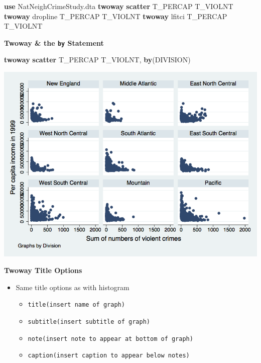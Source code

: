\documentclass[]{book}
\newenvironment{Shaded}{\begin{snugshade}}{\end{snugshade}}
\newcommand{\BaseNTok}[1]{\textcolor[rgb]{0.00,0.00,0.81}{#1}}
\newcommand{\KeywordTok}[1]{\textcolor[rgb]{0.13,0.29,0.53}{\textbf{#1}}}
\newcommand{\NormalTok}[1]{#1}
\providecommand{\tightlist}{%
  \setlength{\itemsep}{0pt}\setlength{\parskip}{0pt}}
\begin{document}
\begin{Shaded}
\begin{Highlighting}[]
  \KeywordTok{use}\NormalTok{ NatNeighCrimeStudy.dta}
  \KeywordTok{twoway} \KeywordTok{scatter}\NormalTok{ T_PERCAP T_VIOLNT}
  \KeywordTok{twoway} \BaseNTok{dropline}\NormalTok{ T_PERCAP T_VIOLNT}
  \KeywordTok{twoway}\NormalTok{  lfitci T_PERCAP T_VIOLNT}
\end{Highlighting}
\end{Shaded}

\textbf{Twoway \& the \texttt{by} Statement}

\begin{Shaded}
\begin{Highlighting}[]
  \KeywordTok{twoway} \KeywordTok{scatter}\NormalTok{ T_PERCAP T_VIOLNT, }\KeywordTok{by}\NormalTok{(DIVISION)}
\end{Highlighting}
\end{Shaded}

\includegraphics{Stata/StataModGraph/images/twowayby.png}

\textbf{Twoway Title Options}

\begin{itemize}
\tightlist
\item
  Same title options as with histogram

  \begin{itemize}
  \tightlist
  \item
    \texttt{title(insert\ name\ of\ graph)}
  \item
    \texttt{subtitle(insert\ subtitle\ of\ graph)}
  \item
    \texttt{note(insert\ note\ to\ appear\ at\ bottom\ of\ graph)}
  \item
    \texttt{caption(insert\ caption\ to\ appear\ below\ notes)}
  \end{itemize}
\end{itemize}
\end{document}
